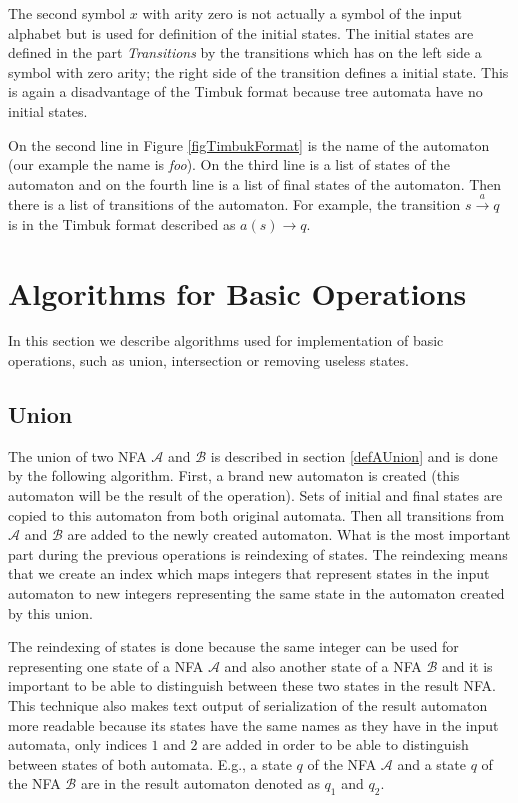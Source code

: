 The second symbol $x$ with arity zero is not actually a symbol of the input alphabet but is used for definition of the initial states. The
initial states are defined in the part \emph{Transitions} by the transitions which has on the left side a symbol with zero arity; the
right side of the transition defines a initial state. This is again a disadvantage
of the Timbuk format because tree automata have no initial states.

On the second line in Figure \ref{figTimbukFormat} is the name of the automaton (our example the name is \emph{foo}). 
On the third line is a list of states of the automaton and on the fourth line is a list of final states of the automaton.
Then there is a list of transitions of the automaton. 
For example, the transition $s \xrightarrow{a} q$ is in the Timbuk format described as $a(s)\rightarrow q$.

\section{Algorithms for Basic Operations}
In this section we describe algorithms used for implementation of basic operations, such as union, intersection or removing useless states. 

\subsection{Union}
The union of two NFA $\mathcal{A}$ and $\mathcal{B}$ is described in section \ref{defAUnion} and
is done by the following algorithm. First, a brand new automaton is created (this automaton
will be the result of the operation). 
Sets of initial and final states are copied to this automaton from both original automata. Then all transitions from $\mathcal{A}$ and
$\mathcal{B}$ are added to the newly created automaton. What is the most important part during the previous operations is reindexing of states. 
The reindexing means that we create an index which maps
integers that represent states in the input automaton to new integers representing the same state in the automaton created by this union.

The reindexing of states is done because the same integer can be used for representing one state of a NFA $\mathcal{A}$ 
and also another state of a NFA $\mathcal{B}$ and it is important
to be able to distinguish between these two states in the result NFA. This technique also makes text output of serialization of the result automaton 
more readable because its states have the same names as they have in the input automata, only indices $1$ and $2$ are added in order to be able to 
distinguish between states of both automata. E.g., a state $q$ of the NFA $\mathcal{A}$ and a state $q$ of the 
NFA $\mathcal{B}$ are in the result automaton denoted as $q_1$ and $q_2$.


